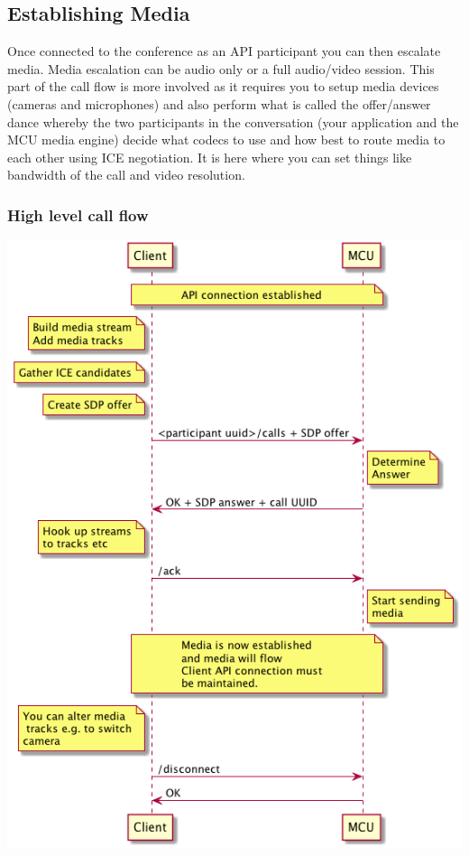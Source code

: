 \documentclass[a4paper,11pt]{article}
\begin{document}
\subsection{Establishing Media}
\label{sec:orgheadline31}

Once connected to the conference as an API participant you can then
escalate media.  Media escalation can be audio only or a full
audio/video session.  This part of the call flow is more involved as
it requires you to setup media devices (cameras and microphones) and
also perform what is called the offer/answer dance whereby the two
participants in the conversation (your application and the MCU media
engine) decide what codecs to use and how best to route media to each
other using ICE negotiation.  It is here where you can set things like
bandwidth of the call and video resolution.

\subsubsection{High level call flow}
\label{sec:orgheadline19}

\includegraphics[width=.9\linewidth]{images/media_flow_sequence.png}
\end{document}
